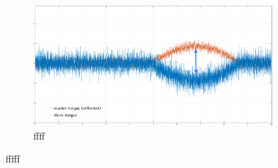\begin{figure}
\begin{subfigure}[h!]{1\linewidth}
		\includegraphics[width=\textwidth, height=\textwidth/2]{Images/setPointContactReacTorArrow}
		\caption{ ffff}
		\label{fig:ContactSetTor}
	\end{subfigure}	
 \caption{ fffff }
\end{figure}

